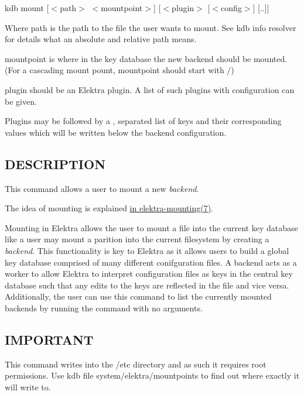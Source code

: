 {\ttfamily kdb mount \mbox{[}$<$path$>$ $<$mountpoint$>$\mbox{]} \mbox{[}$<$plugin$>$ \mbox{[}$<$config$>$\mbox{]} \mbox{[}..\mbox{]}\mbox{]}}


\begin{DoxyItemize}
\item Where {\ttfamily path} is the path to the file the user wants to mount. See {\ttfamily kdb info resolver} for details what an absolute and relative path means.
\item {\ttfamily mountpoint} is where in the key database the new backend should be mounted. (For a cascading mount pount, {\ttfamily mountpoint} should start with {\ttfamily /})
\item {\ttfamily plugin} should be an Elektra plugin. A list of such plugins with configuration can be given.
\item Plugins may be followed by a {\ttfamily ,} separated list of keys and their corresponding values which will be written below the backend configuration.
\end{DoxyItemize}

\subsection*{D\+E\+S\+C\+R\+I\+P\+T\+I\+O\+N}

This command allows a user to mount a new {\itshape backend}.

The idea of mounting is explained \hyperlink{md_doc_help_elektra-mounting_doc_help_elektra-mounting_md}{in elektra-\/mounting(7)}.

Mounting in Elektra allows the user to mount a file into the current key database like a user may mount a parition into the current filesystem by creating a {\itshape backend}. This functionality is key to Elektra as it allows users to build a global key database comprised of many different conifguration files. A backend acts as a worker to allow Elektra to interpret configuration files as keys in the central key database such that any edits to the keys are reflected in the file and vice versa. Additionally, the user can use this command to list the currently mounted backends by running the command with no arguments.

\subsection*{I\+M\+P\+O\+R\+T\+A\+N\+T}

This command writes into the {\ttfamily /etc} directory and as such it requires root permissions. Use {\ttfamily kdb file system/elektra/mountpoints} to find out where exactly it will write to.

